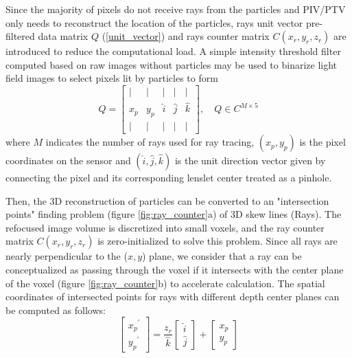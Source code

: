 \documentclass[draftthesis,fullpage]{uiucthesis}
\begin{document}
Since the majority of pixels do not receive rays from the particles and PIV/PTV only needs to reconstruct the location of the particles, rays unit vector pre-filtered data matrix $Q$ (\autoref{unit_vector}) and rays counter matrix $C(x_r,y_r,z_r)$ are introduced to reduce the computational load. A simple intensity threshold filter computed based on raw images without particles 
may be used to binarize light field images to select pixels lit by particles to form
\begin{equation}
       Q=\left[\begin{array}{ccccc}
       \mid & \mid & \mid & \mid & \mid \\
       x_p & y_p & \hat{i} & \hat{j} & \hat{k} \\
       \mid & \mid & \mid & \mid & \mid
       \end{array}\right], \quad Q \in C^{M \times 5}
       \label{unit_vector}
\end{equation}
where $M$ indicates the number of rays used for ray tracing, $(x_p, y_p)$ is the pixel coordinates on the sensor and $(\hat{i}, \hat{j}, \hat{k})$ is the unit direction vector given by connecting the pixel and its corresponding lenslet center treated as a pinhole.

Then, the 3D reconstruction of particles can be converted to an "intersection points" finding problem (figure \ref{fig:ray_counter}a) of 3D skew lines (Rays). The refocused image volume is discretized into small voxels, and the ray counter matrix $C(x_r,y_r,z_r)$ is zero-initialized to solve this problem. Since all rays are nearly perpendicular to the ($x,y$) plane, we consider that a ray can be conceptualized as passing through the voxel if it intersects with the center plane of the voxel (figure \ref{fig:ray_counter}b) to accelerate calculation. The spatial coordinates of intersected points for rays with different depth center planes can be computed as follows:
\begin{equation}
  \left[\begin{array}{c}
    {x_p}^{\prime} \\
    {y_p}^{\prime}
    \end{array}\right]=\frac{z_r}{\hat{k}}\left[\begin{array}{c}
    \hat{i} \\
    \hat{j}
    \end{array}\right] + 
    \left[\begin{array}{c}
    x_p \\
    y_p
    \end{array}\right]
  \label{eq:intersection}
\end{equation}
\end{document}
